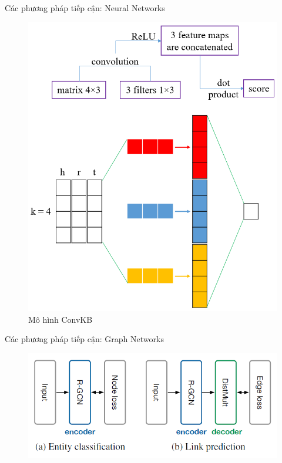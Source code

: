 \documentclass[notheorems, aspectratio=54]{beamer}
\begin{document}
	\begin{frame}{Các phương pháp tiếp cận: Neural Networks}
		\begin{figure}[H]
			\includegraphics[width=0.5\linewidth]{figs/ConvKB.png}
			\caption{Mô hình ConvKB}
			\label{fig:writing-thesis}
		\end{figure}
	\end{frame}
	\begin{frame}{Các phương pháp tiếp cận: Graph Networks}
		\begin{figure}[H]
			\includegraphics[width=1\linewidth]{figs/graph_nets_01.png}
			\label{fig:writing-thesis}
		\end{figure}
	\end{frame}
\end{document}
